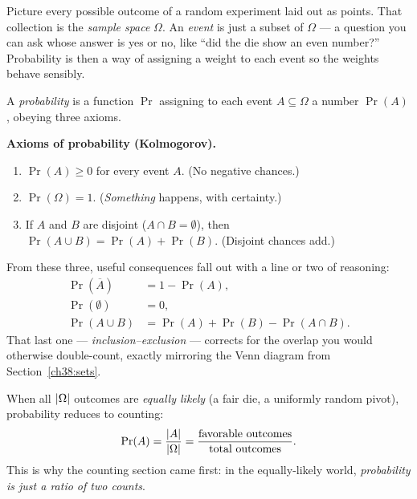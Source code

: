 \begin{intuitionbox}
Picture every possible outcome of a random experiment laid out as points. That
collection is the \emph{sample space} $\Omega$. An \emph{event} is just a subset of
$\Omega$ --- a question you can ask whose answer is yes or no, like ``did the die show
an even number?'' Probability is then a way of assigning a weight to each event so the
weights behave sensibly.
\end{intuitionbox}

A \emph{probability} is a function $\Pr$ assigning to each event $A \subseteq \Omega$
a number $\Pr(A)$, obeying three axioms.

\begin{formalbox}
\textbf{Axioms of probability (Kolmogorov).}
\begin{enumerate}
\item $\Pr(A) \ge 0$ for every event $A$. (No negative chances.)
\item $\Pr(\Omega) = 1$. (\emph{Something} happens, with certainty.)
\item If $A$ and $B$ are disjoint ($A \cap B = \emptyset$), then
$\Pr(A \cup B) = \Pr(A) + \Pr(B)$. (Disjoint chances add.)
\end{enumerate}
\end{formalbox}

From these three, useful consequences fall out with a line or two of reasoning:
\begin{align*}
\Pr(\overline{A}) &= 1 - \Pr(A), \\
\Pr(\emptyset) &= 0, \\
\Pr(A \cup B) &= \Pr(A) + \Pr(B) - \Pr(A \cap B).
\end{align*}
That last one --- \emph{inclusion--exclusion} --- corrects for the overlap you would
otherwise double-count, exactly mirroring the Venn diagram from
Section~\ref{ch38:sets}.

When all $\lvert\Omega\rvert$ outcomes are \emph{equally likely} (a fair die, a uniformly
random pivot), probability reduces to counting:
\[
\Pr(A) = \frac{\lvert A\rvert}{\lvert\Omega\rvert} = \frac{\text{favorable outcomes}}{\text{total outcomes}}.
\]
This is why the counting section came first: in the equally-likely world,
\emph{probability is just a ratio of two counts}.

